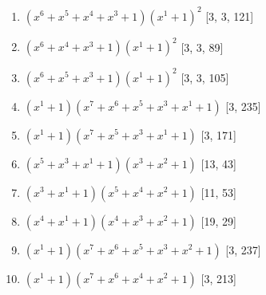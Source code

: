 \documentclass[10pt,twocolumn]{article}
\begin{document}
\begin{enumerate}
\item $(x^{6} + x^{5} + x^{4} + x^{3} + 1)(x^{1} + 1)^{2}$  [3, 3, 121]
\item $(x^{6} + x^{4} + x^{3} + 1)(x^{1} + 1)^{2}$  [3, 3, 89]
\item $(x^{6} + x^{5} + x^{3} + 1)(x^{1} + 1)^{2}$  [3, 3, 105]
\item $(x^{1} + 1)(x^{7} + x^{6} + x^{5} + x^{3} + x^{1} + 1)$  [3, 235]
\item $(x^{1} + 1)(x^{7} + x^{5} + x^{3} + x^{1} + 1)$  [3, 171]
\item $(x^{5} + x^{3} + x^{1} + 1)(x^{3} + x^{2} + 1)$  [13, 43]
\item $(x^{3} + x^{1} + 1)(x^{5} + x^{4} + x^{2} + 1)$  [11, 53]
\item $(x^{4} + x^{1} + 1)(x^{4} + x^{3} + x^{2} + 1)$  [19, 29]
\item $(x^{1} + 1)(x^{7} + x^{6} + x^{5} + x^{3} + x^{2} + 1)$  [3, 237]
\item $(x^{1} + 1)(x^{7} + x^{6} + x^{4} + x^{2} + 1)$  [3, 213]
\end{enumerate}
\end{document}
